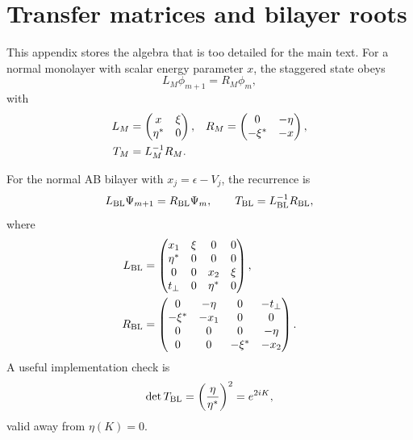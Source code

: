 \section{Transfer matrices and bilayer roots}
\label{app:transfer-matrices}

This appendix stores the algebra that is too detailed for the main text.  For a normal monolayer with scalar energy parameter $x$, the staggered state obeys
\begin{equation}
    L_M\phi_{m+1}=R_M\phi_m,
\end{equation}
with
\begin{align}
    L_M&=
    \begin{pmatrix}
        x & \xi\\
        \eta^* & 0
    \end{pmatrix},
    &
    R_M&=
    \begin{pmatrix}
        0 & -\eta\\
        -\xi^* & -x
    \end{pmatrix},
    \notag\\
    T_M&=L_M^{-1}R_M.
\end{align}

For the normal AB bilayer with $x_j=\epsilon-V_j$, the recurrence is
\begin{equation}
    L_{\rm BL}\Psi_{m+1}=R_{\rm BL}\Psi_m,
    \qquad
    T_{\rm BL}=L_{\rm BL}^{-1}R_{\rm BL},
\end{equation}
where
\begin{align}
    L_{\rm BL}
    &=
    \begin{pmatrix}
        x_1 & \xi & 0 & 0\\
        \eta^* & 0 & 0 & 0\\
        0 & 0 & x_2 & \xi\\
        t_\perp & 0 & \eta^* & 0
    \end{pmatrix},
    \label{eq:TBL-L-app}\\
    R_{\rm BL}
    &=
    \begin{pmatrix}
        0 & -\eta & 0 & -t_\perp\\
        -\xi^* & -x_1 & 0 & 0\\
        0 & 0 & 0 & -\eta\\
        0 & 0 & -\xi^* & -x_2
    \end{pmatrix}.
    \label{eq:TBL-LR-app}
\end{align}
A useful implementation check is
\begin{equation}
    \det T_{\rm BL}=\left(\frac{\eta}{\eta^*}\right)^2=e^{2iK},
\end{equation}
valid away from $\eta(K)=0$.

